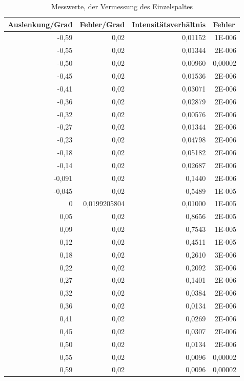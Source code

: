 \documentclass[12pt]{scrartcl}
\begin{document}
\begin{table}[H]
\caption{Messwerte, der Vermessung des Einzelspaltes}
\begin{center}
\begin{tabular}{|r|r|r|r|}
\hline
\multicolumn{1}{|l|}{Auslenkung/Grad} & \multicolumn{1}{l|}{Fehler/Grad} & \multicolumn{1}{l|}{Intensitätsverhältnis} & \multicolumn{1}{l|}{Fehler} \\ \hline
-0,59 & 0,02 & 0,01152 & 1E-006 \\ \hline
-0,55 & 0,02 & 0,01344 & 2E-006 \\ \hline
-0,50 & 0,02 & 0,00960 & 0,00002 \\ \hline
-0,45 & 0,02 & 0,01536 & 2E-006 \\ \hline
-0,41 & 0,02 & 0,03071 & 2E-006 \\ \hline
-0,36 & 0,02 & 0,02879 & 2E-006 \\ \hline
-0,32 & 0,02 & 0,00576 & 2E-006 \\ \hline
-0,27 & 0,02 & 0,01344 & 2E-006 \\ \hline
-0,23 & 0,02 & 0,04798 & 2E-006 \\ \hline
-0,18 & 0,02 & 0,05182 & 2E-006 \\ \hline
-0,14 & 0,02 & 0,02687 & 2E-006 \\ \hline
-0,091 & 0,02 & 0,1440 & 2E-006 \\ \hline
-0,045 & 0,02 & 0,5489 & 1E-005 \\ \hline
0 & 0,0199205804 & 0,01000 & 1E-005 \\ \hline
0,05 & 0,02 & 0,8656 & 2E-005 \\ \hline
0,09 & 0,02 & 0,7543 & 1E-005 \\ \hline
0,12 & 0,02 & 0,4511 & 1E-005 \\ \hline
0,18 & 0,02 & 0,2610 & 3E-006 \\ \hline
0,22 & 0,02 & 0,2092 & 3E-006 \\ \hline
0,27 & 0,02 & 0,1401 & 2E-006 \\ \hline
0,32 & 0,02 & 0,0384 & 2E-006 \\ \hline
0,36 & 0,02 & 0,0134 & 2E-006 \\ \hline
0,41 & 0,02 & 0,0269 & 2E-006 \\ \hline
0,45 & 0,02 & 0,0307 & 2E-006 \\ \hline
0,50 & 0,02 & 0,0134 & 2E-006 \\ \hline
0,55 & 0,02 & 0,0096 & 0,00002 \\ \hline
0,59 & 0,02 & 0,0096 & 0,00002 \\ \hline
\end{tabular}
\end{center}
\label{tab:a_1_m}
\end{table}
\end{document}
